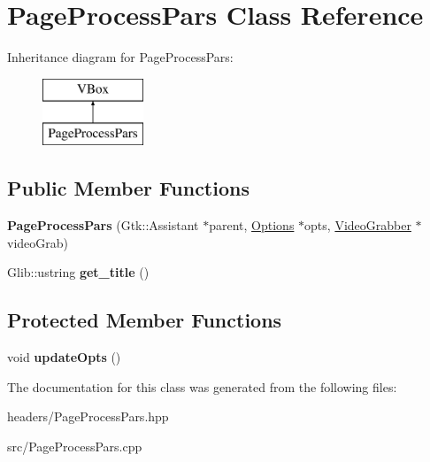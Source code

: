 \hypertarget{classPageProcessPars}{\section{Page\-Process\-Pars Class Reference}
\label{classPageProcessPars}
}
Inheritance diagram for Page\-Process\-Pars\-:\begin{figure}[H]
\begin{center}
\leavevmode
\includegraphics[height=2.000000cm]{classPageProcessPars}
\end{center}
\end{figure}
\subsection*{Public Member Functions}
\begin{DoxyCompactItemize}
\item 
\hypertarget{classPageProcessPars_aaa45dcfab0e838bab662e66df55e6019}{{\bfseries Page\-Process\-Pars} (Gtk\-::\-Assistant $\ast$parent, \hyperlink{structOptions}{Options} $\ast$opts, \hyperlink{classVideoGrabber}{Video\-Grabber} $\ast$video\-Grab)}\label{classPageProcessPars_aaa45dcfab0e838bab662e66df55e6019}

\item 
\hypertarget{classPageProcessPars_a2c272c5932c1a573b6e9824e44d50f90}{Glib\-::ustring {\bfseries get\-\_\-title} ()}\label{classPageProcessPars_a2c272c5932c1a573b6e9824e44d50f90}

\end{DoxyCompactItemize}
\subsection*{Protected Member Functions}
\begin{DoxyCompactItemize}
\item 
\hypertarget{classPageProcessPars_af8e1ac883944e4807932ed8f734bcbfe}{void {\bfseries update\-Opts} ()}\label{classPageProcessPars_af8e1ac883944e4807932ed8f734bcbfe}

\end{DoxyCompactItemize}


The documentation for this class was generated from the following files\-:\begin{DoxyCompactItemize}
\item 
headers/Page\-Process\-Pars.\-hpp\item 
src/Page\-Process\-Pars.\-cpp\end{DoxyCompactItemize}
